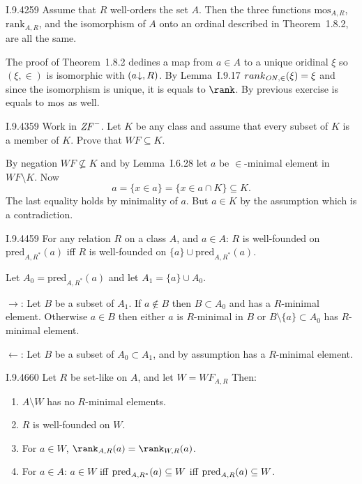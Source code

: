 \begin{lexcopy}{I.9.42}{59}
Assume that $R$ well-orders the set $A$. Then the three 
functions \(\textrm{mos}_{A,R}\), \(\textrm{rank}_{A,R}\),
and the isomorphism of $A$ onto an ordinal described in
Theorem~1.8.2, are all the same.
\end{lexcopy}
The proof of Theorem~1.8.2 dedines a map from \(a\in A\)
to a unique oridinal \(\xi\) so \((\xi,\in)\)
is isomorphic with \((a\kern -0.2em\downarrow,R)\).
By Lemma~I.9.17 \(rank_{\mathit{ON},\in}(\xi) = \xi\)
and since the isomorphism is unique, it is equals to \(\rank\).
By previous exercise is equals to \(\mathop{\mathrm{mos}}\) as well.

\begin{lexcopy}{I.9.43}{59}
Work in \(\mathit{ZF}^-\). Let $K$ be any class and assume that every
subset of $K$ is a member of $K$. Prove that \(WF \subseteq K\).
\end{lexcopy}

By negation \(WF \not\subseteq K\) and by Lemma~I.6.28
let $a$ be \(\in\)-minimal element in \(WF\setminus K\).
Now
\begin{equation*}
a = \{x\in a\} = \{x \in a\cap K\} \subseteq K.
\end{equation*}
The last equality holds by minimality of $a$.
But \(a \in K\) by the assumption which is a contradiction.

\begin{lexcopy}{I.9.44}{59}
For any relation $R$ on a class $A$, and \(a \in A\): $R$
is well-founded on \(\textrm{pred}_{A,R^*}(a)\) iff $R$
is well-founded on \(\{a\} \cup \textrm{pred}_{A,R^*}(a)\).
\end{lexcopy}
Let \(A_0 = \textrm{pred}_{A,R^*}(a)\) and let \(A_1 = \{a\} \cup A_0\).

\(\rightarrow\): Let $B$ be a subset of \(A_1\).
If \(a \notin B\) then \(B \subset A_0\) and has a $R$-minimal element.
Otherwise \(a \in B\) then either $a$ is $R$-minimal in $B$
or \(B \setminus \{a\} \subset A_0\) has $R$-minimal element.

\(\leftarrow\):  Let $B$ be a subset of \(A_0 \subset A_1\),
and by assumption has a $R$-minimal element.

\begin{lexcopy}{I.9.46}{60}
Let $R$ be set-like on $A$, and let \(W = WF_{A,R}\) Then:
\begin{enumerate}
\item \(A\setminus W\) has no $R$-minimal elements.
\item $R$ is well-founded on $W$.
\item For \(a \in W\), \(\rank_{A,R}(a) = \rank_{W,R}(a)\).
\item For \(a\in A\): \(a\in W\) iff \(\mathop{\mathrm{pred}}_{A,R^*}(a) \subseteq W\)
      iff \(\mathop{\mathrm{pred}}_{A,R}(a) \subseteq W\).
\end{enumerate}
\end{lexcopy}

